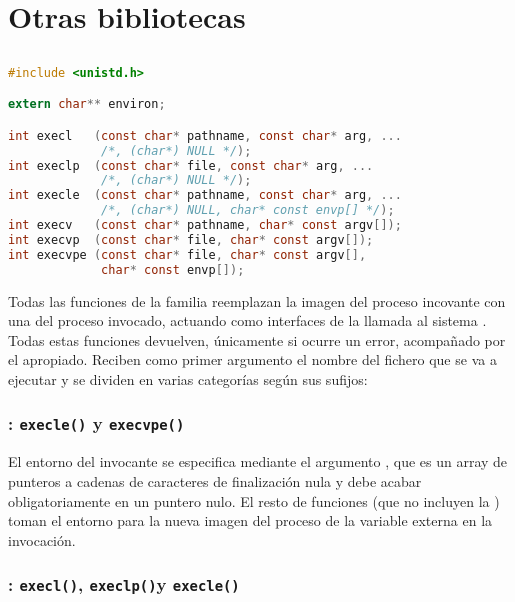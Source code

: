 \chapter{Otras bibliotecas}

\section{}\label{exec}

\begin{lstlisting}[language=C]
#include <unistd.h>

extern char** environ;

int execl   (const char* pathname, const char* arg, ...
             /*, (char*) NULL */);
int execlp  (const char* file, const char* arg, ...
             /*, (char*) NULL */);
int execle  (const char* pathname, const char* arg, ...
             /*, (char*) NULL, char* const envp[] */);
int execv   (const char* pathname, char* const argv[]);
int execvp  (const char* file, char* const argv[]);
int execvpe (const char* file, char* const argv[],
             char* const envp[]);
\end{lstlisting}

Todas las funciones de la familia  reemplazan la imagen del proceso incovante con una del proceso invocado, actuando como interfaces de la llamada al sistema .
Todas estas funciones devuelven, únicamente si ocurre un error,  acompañado por el  apropiado.
Reciben como primer argumento el nombre del fichero que se va a ejecutar y se dividen en varias categorías según sus sufijos:

\subsection{: \texttt{execle()} y \texttt{execvpe()}}

El entorno del invocante se especifica mediante el argumento , que es un array de punteros a cadenas de caracteres de finalización nula y debe acabar obligatoriamente en un puntero nulo.
El resto de funciones  (que no incluyen la ) toman el entorno para la nueva imagen del proceso de la variable externa  en la invocación.

\subsection{: \texttt{execl()}, \texttt{execlp()}y \texttt{execle()}}

